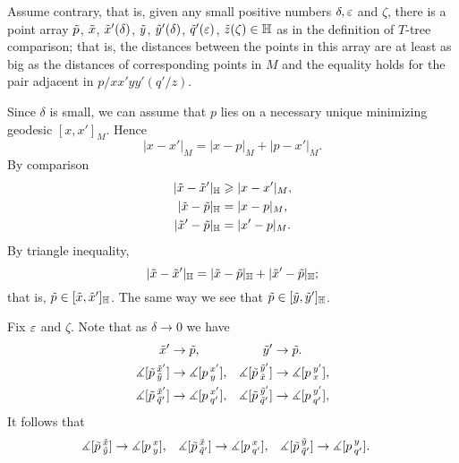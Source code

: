 Assume contrary, that is, given any small positive numbers $\delta,\eps$ and $\zeta$, there is a point array $\~p$, $\~x$, $\~x'(\delta)$, $\~y$, $\~y'(\delta)$, $\~q'(\eps)$, $\~z(\zeta)\in\HH$ as in the definition of $T$-tree comparison;
that is, the distances between the points in this array are at least as big as the distances of corresponding points in $M$ and the equality holds for the pair adjacent in $p/xx'yy'(q'/z)$.


\hide
\begin{wrapfigure}{r}{35 mm}
\end{wrapfigure}
\unhide

Since $\delta$ is small, we can assume that $p$ lies on a necessary unique minimizing geodesic $[x,x']_M$.
Hence 
\[|x-x'|_M=|x-p|_M+|p-x'|_M.\]
By comparison
\begin{align*}
|\~x-\~x'|_\HH&\ge|x-x'|_M,
\\
|\~x-\~p|_\HH&=|x-p|_M,
\\
|\~x'-\~p|_\HH&=|x'-p|_M.
\end{align*}
By triangle inequality,
\[|\~x-\~x'|_\HH=|\~x-\~p|_\HH+|\~x'-\~p|_\HH;\]
that is, $\~p\in [\~x,\~x']_\HH$.
The same way we see that $\~p\in [\~y,\~y']_\HH$.

Fix $\eps$ and $\zeta$.
Note that as $\delta\to 0$ we have 
\begin{align*}
\~x'&\to \~p,
&
\~y'&\to \~p.
\\
\measuredangle[\~p\,^{\~x'}_{\~y}]&\to \measuredangle[p\,^{x'}_{y}],
&
\measuredangle[\~p\,^{\~y'}_{\~x}]&\to \measuredangle[p\,^{y'}_{x}],
\\
\measuredangle[\~p\,^{\~x'}_{\~q'}]&\to \measuredangle[p\,^{x'}_{q'}],
&
\measuredangle[\~p\,^{\~y'}_{\~q'}]&\to \measuredangle[p\,^{y'}_{q'}],
\end{align*}
It follows that 
\begin{align*}
\measuredangle[\~p\,^{\~x}_{\~y}]&\to \measuredangle[p\,^x_y],
&
\measuredangle[\~p\,^{\~x}_{\~q'}]&\to \measuredangle[p\,^x_{q'}],
&
\measuredangle[\~p\,^{\~y}_{\~q'}]&\to \measuredangle[p\,^y_{q'}].
\end{align*}


